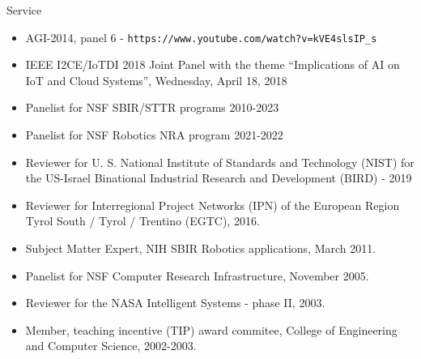 \begin{category}{Service}
\begin{itemize}
\item AGI-2014, panel 6 - \verb+https://www.youtube.com/watch?v=kVE4slsIP_s+

\item IEEE I2CE/IoTDI 2018 Joint Panel with the theme
``Implications of AI on IoT and Cloud Systems'', Wednesday, April 18, 2018

\end{itemize}



%
%

\begin{itemize}

\item Panelist for NSF SBIR/STTR programs 2010-2023

\item Panelist for NSF Robotics NRA program 2021-2022

\item Reviewer for U. S. National Institute of Standards and Technology (NIST) for the US-Israel Binational Industrial Research and Development (BIRD) - 2019

\item Reviewer for Interregional Project Networks (IPN) of the European Region Tyrol South / Tyrol / Trentino (EGTC), 2016.


\item Subject Matter Expert, NIH SBIR Robotics applications, March 2011.

\item Panelist for NSF Computer Research Infrastructure, November 2005.

\item Reviewer for the NASA Intelligent Systems - phase II, 2003.

\end{itemize}

%
%

\begin{itemize}

\item Member, teaching incentive (TIP) award commitee, College of Engineering and Computer Science, 2002-2003.


\end{itemize}
\end{category}
